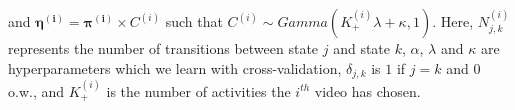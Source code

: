 \documentclass[10pt,twocolumn,letterpaper]{article}
\begin{document}
and \mbox{$\mathbf{\eta^{(i)}}=\mathbf{\pi^{(i)}} \times C^{(i)}$} such that \mbox{$C^{(i)} \sim Gamma( K^{(i)}_+\lambda +\kappa,1)$}. Here, $N^{(i)}_{j,k}$ represents the number of transitions between state $j$ and state $k$, $\alpha$, $\lambda$ and $\kappa$ are hyperparameters which we learn with cross-validation, $\delta_{j,k}$ is $1$ if $j=k$ and $0$ o.w., and $K^{(i)}_+$ is the number of activities the $i^{th}$ video has chosen.

{\small


}
\end{document}
